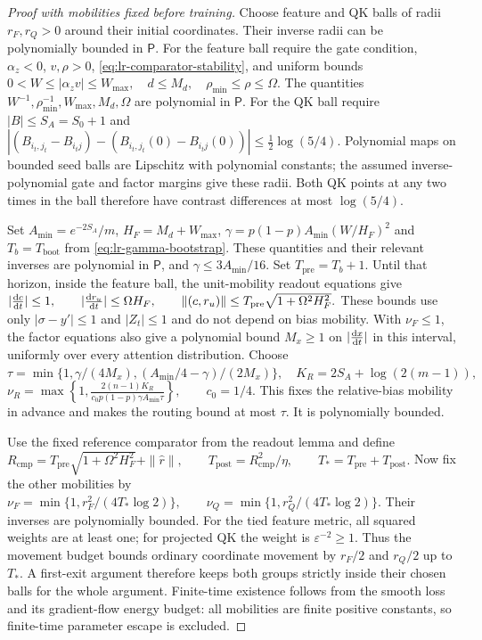 \begin{proof}[Proof with mobilities fixed before training]
Choose feature and QK balls of radii $r_F,r_Q>0$ around their initial
coordinates. Their inverse radii can be polynomially bounded in $\mathsf P$.
For the feature ball require the gate condition, $\alpha_z<0$, $v,\rho>0$,
\eqref{eq:lr-comparator-stability}, and uniform bounds
 $0<W\le|{\alpha_z v}|\le W_{\max},\quad d\le M_d,\quad \rho_{\min}\le\rho\le\Omega.$ 
The quantities $W^{-1},\rho_{\min}^{-1},W_{\max},M_d,\Omega$ are
polynomial in $\mathsf P$. For the QK ball require $|B|\le S_A=S_0+1$ and
 $|(B_{i_t,j_t}-B_{i_tj})-(B_{i_t,j_t}(0)-B_{i_tj}(0))| \le\tfrac12\log(5/4).$ 
Polynomial maps on bounded seed balls are Lipschitz with polynomial
constants; the assumed inverse-polynomial gate and factor margins give
these radii. Both QK points at any two times in the ball therefore have
contrast differences at most $\log(5/4)$.

Set $A_{\min}=e^{-2S_A}/m$, $H_F=M_d+W_{\max}$,
$\gamma=p(1-p) A_{\min}(W/H_F)^2$ and $T_b=T_{\mathrm{boot}}$ from
\eqref{eq:lr-gamma-bootstrap}. These quantities and their relevant
inverses are polynomial in $\mathsf P$, and $\gamma\le3A_{\min}/16$.
Set $T_{\mathrm{pre}}=T_b+1$. Until that horizon, inside the feature
ball, the unit-mobility readout equations give
 $|\ddt{c}|\le1,\qquad |\ddt{r_u}|\le\Omega H_F, \qquad \|(c,r_u)\|\le T_{\mathrm{pre}}\sqrt{1+\Omega^2H_F^2}.$ 
These bounds use only $|\sigma-y'|\le1$ and $|Z_t|\le1$ and do not
depend on bias mobility. With $\nu_F\le1$, the factor equations also
give a polynomial bound $M_x\ge1$ on $|\ddt{x}|$ in this interval,
uniformly over every attention distribution. Choose
 $\tau=\min\{1,\gamma/(4M_x),(A_{\min}/4-\gamma)/(2M_x)\}, \quad K_R=2S_A+\log(2(m-1)),$ 
 $\nu_R=\max\left\{1, \frac{2(n-1)K_R}{c_0p(1-p)\gamma A_{\min}\tau}\right\}, \qquad c_0=1/4.$ 
This fixes the relative-bias mobility in advance and makes the routing
bound at most $\tau$. It is polynomially bounded.

Use the fixed reference comparator from the readout lemma and define
 $R_{\mathrm{cmp}}=T_{\mathrm{pre}}\sqrt{1+\Omega^2H_F^2}+\|\widehat r\|, \qquad T_{\mathrm{post}}=R_{\mathrm{cmp}}^2/\eta,\qquad T_*=T_{\mathrm{pre}}+T_{\mathrm{post}}.$ 
Now fix the other mobilities by
 $\nu_F=\min\{1,r_F^2/(4T_*\log2)\},\qquad \nu_Q=\min\{1,r_Q^2/(4T_*\log2)\}.$ 
Their inverses are polynomially bounded. For the tied feature metric,
all squared weights are at least one; for projected QK the weight is
$\varepsilon^{-2}\ge1$. Thus the movement budget bounds ordinary
coordinate movement by $r_F/2$ and $r_Q/2$ up to $T_*$.
A first-exit argument therefore keeps both groups strictly inside their
chosen balls for the whole argument. Finite-time existence follows from
the smooth loss and its gradient-flow energy budget: all mobilities are
finite positive constants, so finite-time parameter escape is excluded.


\end{proof}
